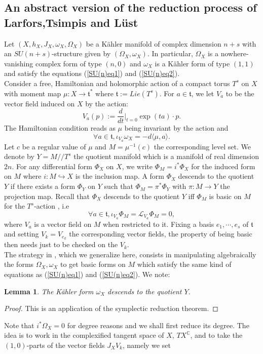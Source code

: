 \documentclass[12pt, reqno]{amsart}
\newtheorem{lemma}[Def]{Lemma}
\newcommand{\C}{\mathbb{C}}
\newcommand{\tor}{\mathfrak{t}}
\newcommand{\lied}{\mathcal{L}}
\begin{document}
\subsection{An abstract version of the reduction process of Larfors,Tsimpis and Lüst}
Let $(X,h_X,J_X,\omega_X,\Omega_X)$ be a Kähler manifold of complex dimension $n+s$ with an $SU(n+s)$-structure given by $(\Omega_X,\omega_X)$. In particular, $\Omega_X$ is a nowhere-vanishing complex form of type $(n,0)$ and $\omega_X$ is a Kähler form of type $(1,1)$ and satisfy the equations (\ref{SU(n)eq1}) and (\ref{SU(n)eq2}). \\ \indent Consider a free, Hamiltonian and holomorphic action of a compact torus $T^s$ on $X$ with moment map $\mu : X\to\tor^*$ where $\tor :=Lie(T^s)$. For $a\in\tor$, we let $V_a$ to be the vector field induced on $X$ by the action: \[V_a(p):=\frac{d}{dt}\bigg|_{t=0}\exp(ta)\cdot p.\]
The Hamiltonian condition reads as $\mu$ being invariant by the action and \[\forall a\in\tor, \iota_{V_a}\omega_X=-d\langle\mu,a\rangle.\]
\indent Let $c$ be a regular value of $\mu$ and $M=\mu^{-1}(c)$ the corresponding level set. We denote by $Y=M/\!\!/T^s$ the quotient manifold which is a manifold of real dimension $2n$. For any differential form $\Phi_X$ on $X$, we write $\Phi_M=i^*\Phi_X$ for the induced form on $M$ where $i : M\hookrightarrow X$ is the inclusion map. A form $\Phi_X$ descends to the quotient $Y$ if there exists a form $\Phi_Y$ on $Y$ such that $\Phi_M=\pi^*\Phi_Y$ with $\pi : M\to Y$ the projection map. Recall that $\Phi_X$ descends to the quotient $Y$ iff $\Phi_M$ is basic on $M$ for the $T^s$-action , i.e \[\forall a\in\tor,\iota_{V_a}\Phi_M=\lied_{V_a}\Phi_M=0,\] where $V_a$ is a vector field on $M$ when restricted to it. Fixing a basis $e_1,\cdots,e_s$ of $\tor$ and setting $V_k=V_{e_k}$ the corresponding vector fields, the property of being basic then needs just to be checked on the $V_k$.\\
\indent The strategy in \cite{Larfors_2010}, which we generalize here, consists in manipulating algebraically the forms $\Omega_X,\omega_X$ to get basic forms on $M$ which satisfy the same kind of equations as (\ref{SU(n)eq1}) and (\ref{SU(n)eq2}). We note:
\begin{lemma}
    The Kähler form $\omega_X$ descends to the quotient $Y$.
\end{lemma}
\begin{proof}
    This is an application of the symplectic reduction theorem.
\end{proof}
Note that $i^*\Omega_X=0$ for degree reasons and we shall first reduce its degree. The idea is to work in the complexified tangent space of $X$, $TX^\C$, and to take the $(1,0)$-parts of the vector fields $J_XV_k$, namely we set
\end{document}
